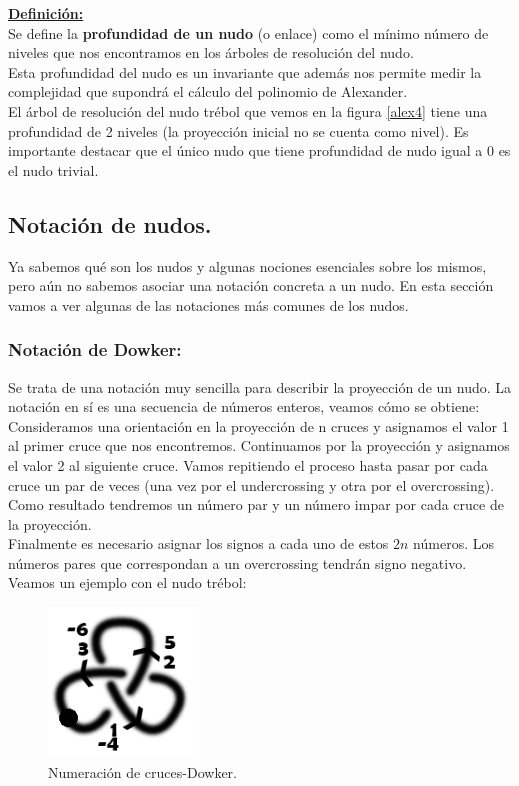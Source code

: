 \documentclass[14pt]{extarticle}
\begin{document}
\underline{\textbf{Definición:}}\\
Se define la \textbf{profundidad de un nudo} (o enlace) como el mínimo número de niveles que nos encontramos en los árboles de resolución del nudo. \\

Esta profundidad del nudo es un invariante que además nos permite medir la complejidad que supondrá el cálculo del polinomio de Alexander. \\

El árbol de resolución del nudo trébol que vemos en la figura \ref{alex4} tiene una profundidad de 2 niveles (la proyección inicial no se cuenta como nivel). Es importante destacar que el único nudo que tiene profundidad de nudo igual a 0 es el nudo trivial. \\
 
\newpage
\subsection{Notación de nudos.}
Ya sabemos qué son los nudos y algunas nociones esenciales sobre los mismos, pero aún no sabemos asociar una notación concreta a un nudo. En esta sección vamos a ver algunas de las notaciones más comunes de los nudos. 

\begin{center}
	\item \subsubsection{Notación de Dowker:}
\end{center}
Se trata de una notación muy sencilla para describir la proyección de un nudo. La notación en sí es una secuencia de números enteros, veamos cómo se obtiene:\\

Consideramos una orientación en la proyección de n cruces y asignamos el valor 1 al primer cruce que nos encontremos. Continuamos por la proyección y asignamos el valor 2 al siguiente cruce. Vamos repitiendo el proceso hasta pasar por cada cruce un par de veces (una vez por el undercrossing y otra por el overcrossing). Como resultado tendremos un número par y un número impar por cada cruce de la proyección. \\

Finalmente es necesario asignar los signos a cada uno de estos $2n$ números. Los números pares que correspondan a un overcrossing tendrán signo negativo. Veamos un ejemplo con el nudo trébol:\\
   \begin{figure}[h!]
   	\centering
   	\includegraphics[width=4cm]{inudos/3fcon2dow.png}
   	\caption{Numeración de cruces-Dowker.}
   	\label{dow1} 
   \end{figure}
   
\end{document}
